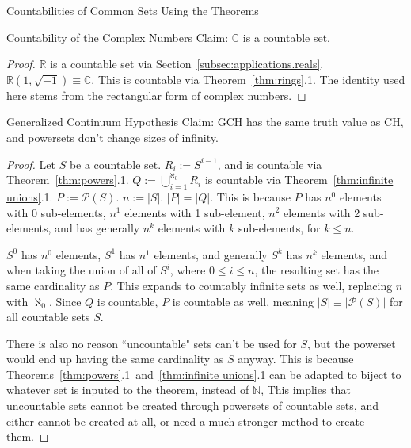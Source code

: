 \documentclass[12pt]{article}
\begin{document}
\begin{section}{Countabilities of Common Sets Using the Theorems}
	\begin{subsection}{Countability of the Complex Numbers}\label{subsec:applications.complex}
		Claim: $\mathbb C$ is a countable set.
		\begin{proof}
			$\mathbb R$ is a countable set via Section~\ref{subsec:applications.reals}.
			$\mathbb R(1, \sqrt{-1})\equiv\mathbb C$. This is countable via Theorem~\ref{thm:rings}.1.
			The identity used here stems from the rectangular form of complex numbers.
		\end{proof}
	\end{subsection}
\end{section}

\begin{section}{Generalized Continuum Hypothesis}\label{sec:GCH}
	Claim: GCH has the same truth value as CH, and powersets don't change sizes of infinity.
	\begin{proof}
		Let $S$ be a countable set. $R_i := S^{i-1}$, and is countable via Theorem~\ref{thm:powers}.1.
		$\displaystyle Q:=\bigcup_{i=1}^{\aleph_0}R_i$ is countable via
		Theorem~\ref{thm:infinite unions}.1. $P :=\mathcal P(S)$. $n := |S|$. $|P|=|Q|$.
		This is because $P$ has
		$n^0$ elements with 0 sub-elements,
		$n^1$ elements with 1 sub-element,
		$n^2$ elements with 2 sub-elements, and has generally
		$n^k$ elements with $k$ sub-elements, for $k\leqslant n$.

		$S^0$ has $n^0$ elements,
		$S^1$ has $n^1$ elements, and generally
		$S^k$ has $n^k$ elements, and when taking the union of all of $S^i$, where
		$0\leqslant i\leqslant n$, the resulting set has the same cardinality as $P$. This expands
		to countably infinite sets as well, replacing $n$ with $\aleph_0$. Since $Q$ is countable,
		$P$ is countable as well, meaning $|S|\equiv|\mathcal P(S)|$ for all countable sets $S$.

		There is also no reason ``uncountable" sets can't be used for $S$, but the powerset
		would end up having the same cardinality as $S$ anyway. This is because
		Theorems~\ref{thm:powers}.1~and~\ref{thm:infinite unions}.1 can be adapted to biject to
		whatever set is inputed to the theorem, instead of $\mathbb N$, This implies that
		uncountable sets cannot be created through powersets of countable sets, and either cannot
		be created at all, or need a much stronger method to create them.
	\end{proof}
\end{section}
\end{document}
